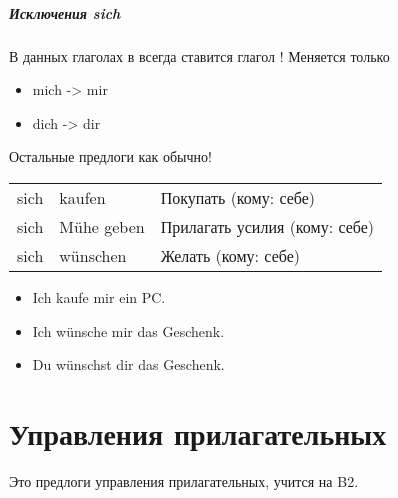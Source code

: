 \paragraph{Исключения sich \dat}

В данных глаголах в \dat всегда ставится глагол ! Меняется только

\begin{itemize}
\item mich -> mir
\item dich -> dir
\end{itemize}

Остальные предлоги как обычно!
\begin{longtable}{ l l l }
	sich \dat & kaufen & Покупать (кому: себе) \\
	sich \dat & Mühe geben & Прилагать усилия (кому: себе) \\
	sich \dat & wünschen & Желать (кому: себе) \\
\end{longtable}

\begin{itemize}
\item Ich kaufe mir ein PC.
~\\ 
\item Ich wünsche mir das Geschenk.
~\\ 
\item Du wünschst dir das Geschenk.
~\\ 
\end{itemize}

\chapter{Управления прилагательных}

Это предлоги управления прилагательных, учится на B2.

